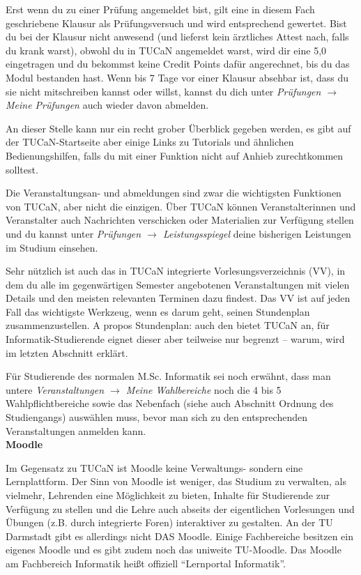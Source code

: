 {    Erst wenn du zu einer Prüfung angemeldet bist, gilt eine in diesem Fach geschriebene Klausur als Prüfungsversuch und wird entsprechend gewertet. Bist du bei der Klausur nicht anwesend (und lieferst kein ärztliches Attest nach, falls du krank warst), obwohl du in TUCaN angemeldet warst, wird dir eine 5,0 eingetragen und du bekommst keine Credit Points dafür angerechnet, bis du das Modul bestanden hast. Wenn bis 7 Tage vor einer Klausur absehbar ist, dass du sie nicht mitschreiben kannst oder willst, kannst du dich unter \emph{Prüfungen $\rightarrow$ Meine Prüfungen} auch wieder davon abmelden.

    An dieser Stelle kann nur ein recht grober Überblick gegeben werden, es gibt auf der TUCaN-Startseite aber einige Links zu Tutorials und ähnlichen Bedienungshilfen, falls du mit einer Funktion nicht auf Anhieb zurechtkommen solltest.

    Die Veranstaltungsan- und abmeldungen sind zwar die wichtigsten Funktionen von TUCaN, aber nicht die einzigen. Über TUCaN können Veranstalterinnen und Veranstalter auch Nachrichten verschicken oder Materialien zur Verfügung stellen und du kannst unter \emph{Prüfungen $\rightarrow$ Leistungsspiegel} deine bisherigen Leistungen im Studium einsehen.

    Sehr nützlich ist auch das in TUCaN integrierte Vorlesungsverzeichnis (VV), in dem du alle im gegenwärtigen Semester angebotenen Veranstaltungen mit vielen Details und den meisten relevanten Terminen dazu findest. Das VV ist auf jeden Fall das wichtigste Werkzeug, wenn es darum geht, seinen Stundenplan zusammenzustellen. A propos Stundenplan: auch den bietet TUCaN an, für Informatik-Studierende eignet dieser aber teilweise nur begrenzt – warum, wird im letzten Abschnitt erklärt.

    Für Studierende des normalen M.Sc. Informatik sei noch erwähnt, dass man untere \emph{Veranstaltungen $\rightarrow$ Meine Wahlbereiche} noch die 4 bis 5 Wahlpflichtbereiche sowie das Nebenfach (siehe auch Abschnitt Ordnung des Studiengangs) auswählen muss, bevor man sich zu den entsprechenden Veranstaltungen anmelden kann.\\

    \noindent\textbf{Moodle}

    Im Gegensatz zu TUCaN ist Moodle keine Verwaltungs- sondern eine Lernplattform. Der Sinn von Moodle ist weniger, das Studium zu verwalten, als vielmehr, Lehrenden eine Möglichkeit zu bieten, Inhalte für Studierende zur Verfügung zu stellen und die Lehre auch abseits der eigentlichen Vorlesungen und Übungen (z.B. durch integrierte Foren) interaktiver zu gestalten. An der TU Darmstadt gibt es allerdings nicht DAS Moodle. Einige Fachbereiche besitzen ein eigenes Moodle und es gibt zudem noch das uniweite TU-Moodle. Das Moodle am Fachbereich Informatik \footnotemark[2] heißt offiziell "`Lernportal Informatik"'.

}
